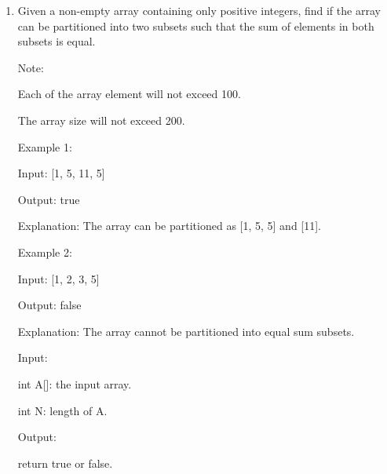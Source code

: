 \documentclass[12pt,a4paper]{article}
\begin{document}
\begin{enumerate}
\item Given a non-empty array containing only positive integers, find if the array can be partitioned into two subsets such that the sum of elements in both subsets is equal.

Note:

Each of the array element will not exceed 100.

The array size will not exceed 200.

Example 1:

Input: [1, 5, 11, 5]

Output: true

Explanation: The array can be partitioned as [1, 5, 5] and [11].

Example 2:

Input: [1, 2, 3, 5]

Output: false

Explanation: The array cannot be partitioned into equal sum subsets.

Input:

int A[]: the input array.

int N: length of A.

Output:

return true or false.


~\\
~\\

\end{enumerate}
\end{document}
